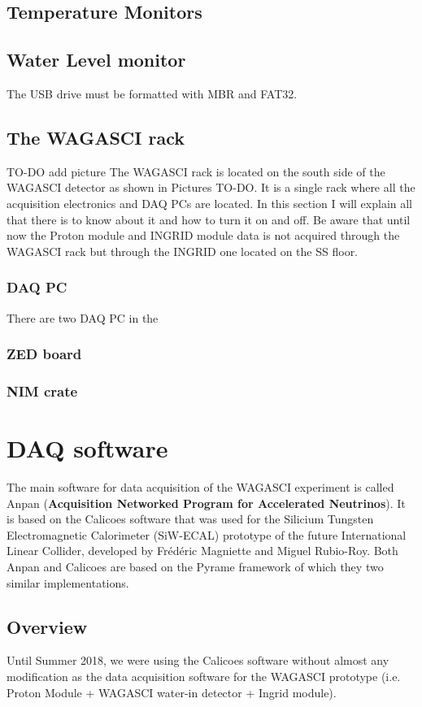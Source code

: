 \section{Temperature Monitors}
\section{Water Level monitor}
The USB drive must be formatted with MBR and FAT32.
\section{The WAGASCI rack}
TO-DO add picture
The WAGASCI rack is located on the south side of the WAGASCI detector as shown
in Pictures TO-DO. It is a single rack where all the acquisition electronics and
DAQ PCs are located. In this section I will explain all that there is to know
about it and how to turn it on and off. Be aware that until now the Proton
module and INGRID module data is not acquired through the WAGASCI rack but
through the INGRID one located on the SS floor.
\subsection{DAQ PC}
There are two DAQ PC in the
\subsection{ZED board}
\subsection{NIM crate}
\chapter{DAQ software}
The main software for data acquisition of the WAGASCI experiment is called Anpan
(\textbf{Acquisition Networked Program for Accelerated Neutrinos}). It is based
on the Calicoes software that was used for the Silicium Tungsten Electromagnetic
Calorimeter (SiW-ECAL) prototype of the future International Linear Collider,
developed by Frédéric Magniette and Miguel Rubio-Roy. Both Anpan and Calicoes
are based on the Pyrame framework of which they two similar implementations.

\section{Overview}
Until Summer 2018, we were using the Calicoes software without almost any
modification as the data acquisition software for the WAGASCI prototype
(i.e. Proton Module + WAGASCI water-in detector + Ingrid module).

